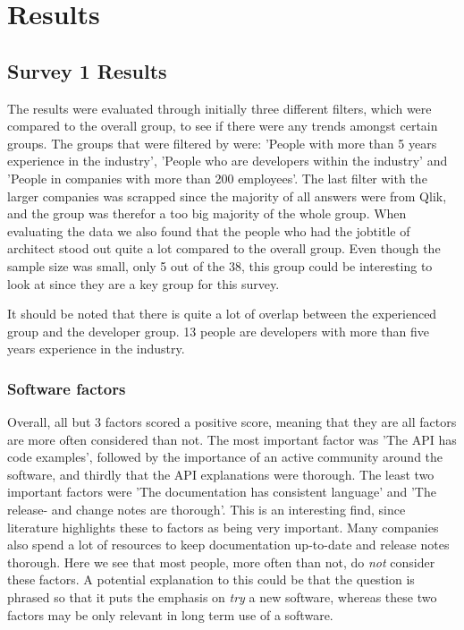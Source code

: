 \documentclass{article}
\begin{document}
\section{Results}

\subsection{Survey 1 Results}


The results were evaluated through initially three different filters,
which were compared to the overall group, to see if there were any
trends amongst certain groups. The groups that were filtered by were:
'People with more than 5 years experience in the industry', 'People who
are developers within the industry' and 'People in companies with more
than 200 employees'. The last filter with the larger companies was
scrapped since the majority of all answers were from Qlik, and the group
was therefor a too big majority of the whole group. When evaluating the
data we also found that the people who had the jobtitle of architect
stood out quite a lot compared to the overall group. Even though the
sample size was small, only 5 out of the 38, this group could be
interesting to look at since they are a key group for this survey.

It should be noted that there is quite a lot of overlap between the
experienced group and the developer group. 13 people are developers with
more than five years experience in the industry.

\subsubsection{Software factors}

Overall, all but 3 factors scored a positive score, meaning that they
are all factors are more often considered than not. The most important
factor was 'The API has code examples', followed by the importance of an
active community around the software, and thirdly that the API
explanations were thorough. The least two important factors were 'The
documentation has consistent language' and 'The release- and change
notes are thorough'. This is an interesting find, since literature
highlights these to factors as being very important. Many companies also
spend a lot of resources to keep documentation up-to-date and release
notes thorough. Here we see that most people, more often than not, do
\textit{not} consider these factors. A potential explanation to this could be
that the question is phrased so that it puts the emphasis on \textit{try} a new
software, whereas these two factors may be only relevant in long term
use of a software.
\end{document}
